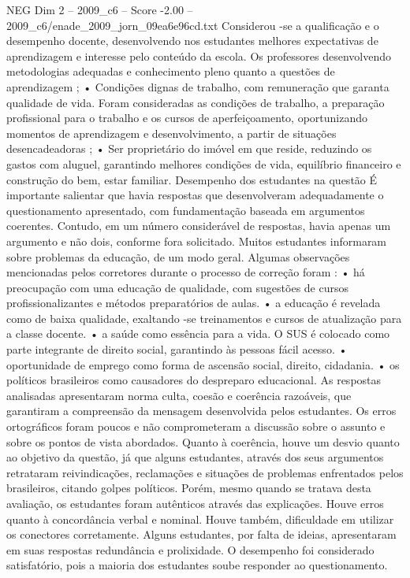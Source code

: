 \begin{textsample}{NEG Dim 2 – 2009\_c6 – Score -2.00 – 2009\_c6/enade\_2009\_jorn\_09ea6e96cd.txt}
Considerou -se a qualificação e o desempenho docente, desenvolvendo nos estudantes melhores expectativas de aprendizagem e interesse pelo conteúdo da escola.
Os professores desenvolvendo metodologias adequadas e conhecimento pleno quanto a questões de aprendizagem ; • Condições dignas de trabalho, com remuneração que garanta qualidade de vida.
Foram consideradas as condições de trabalho, a preparação profissional para o trabalho e os cursos de aperfeiçoamento, oportunizando momentos de aprendizagem e desenvolvimento, a partir de situações desencadeadoras ; • Ser proprietário do imóvel em que reside, reduzindo os gastos com aluguel, garantindo melhores condições de vida, equilíbrio financeiro e construção do bem, estar familiar.
Desempenho dos estudantes na questão É importante salientar que havia respostas que desenvolveram adequadamente o questionamento apresentado, com fundamentação baseada em argumentos coerentes.
Contudo, em um número considerável de respostas, havia apenas um argumento e não dois, conforme fora solicitado.
Muitos estudantes informaram sobre problemas da educação, de um modo geral.
Algumas observações mencionadas pelos corretores durante o processo de correção foram : • há preocupação com uma educação de qualidade, com sugestões de cursos profissionalizantes e métodos preparatórios de aulas. • a educação é revelada como de baixa qualidade, exaltando -se treinamentos e cursos de atualização para a classe docente. • a saúde como essência para a vida.
O SUS é colocado como parte integrante de direito social, garantindo às pessoas fácil acesso. • oportunidade de emprego como forma de ascensão social, direito, cidadania. • os políticos brasileiros como causadores do despreparo educacional.
As respostas analisadas apresentaram norma culta, coesão e coerência razoáveis, que garantiram a compreensão da mensagem desenvolvida pelos estudantes.
Os erros ortográficos foram poucos e não comprometeram a discussão sobre o assunto e sobre os pontos de vista abordados.
Quanto à coerência, houve um desvio quanto ao objetivo da questão, já que alguns estudantes, através dos seus argumentos retrataram reivindicações, reclamações e situações de problemas enfrentados pelos brasileiros, citando golpes políticos.
Porém, mesmo quando se tratava desta avaliação, os estudantes foram autênticos através das explicações.
Houve erros quanto à concordância verbal e nominal.
Houve também, dificuldade em utilizar os conectores corretamente.
Alguns estudantes, por falta de ideias, apresentaram em suas respostas redundância e prolixidade.
O desempenho foi considerado satisfatório, pois a maioria dos estudantes soube responder ao questionamento.

\end{textsample}
